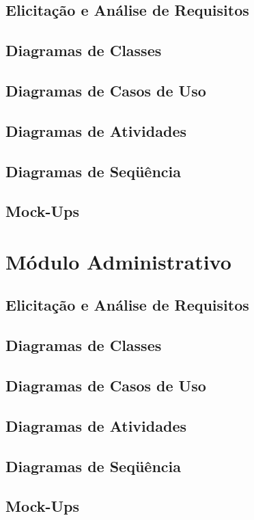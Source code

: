\documentclass[
  10.5pt,				  %
	openright,			%
	twoside,			  %
  a5paper,
  chapter=TITLE,	%
	section=TITLE,	%
  hyphens,        %
	english,        %
	brazil          %
]{abntex2}
\begin{document}
\subsection{Elicitação e Análise de Requisitos}
\subsection{Diagramas de Classes}
\subsection{Diagramas de Casos de Uso}
\subsection{Diagramas de Atividades}
\subsection{Diagramas de Seqüência}
\subsection{Mock-Ups}

\section{Módulo Administrativo}

\subsection{Elicitação e Análise de Requisitos}
\subsection{Diagramas de Classes}
\subsection{Diagramas de Casos de Uso}
\subsection{Diagramas de Atividades}
\subsection{Diagramas de Seqüência}
\subsection{Mock-Ups}
\end{document}
